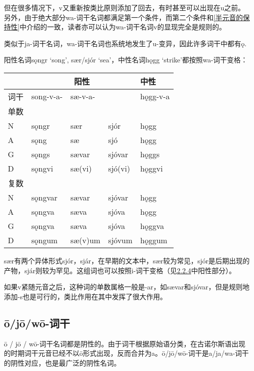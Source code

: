 但在很多情况下，v又重新按类比原则添加了回去，有时甚至可以出现在u之前。另外，由于绝大部分wa-词干名词都满足第一个条件，而第二个条件和\ref{半元音的保持性}中介绍的一致，读者亦可以认为wa-词干名词v的显现完全是规则的。

类似于ja-词干名词，wa-词干名词也系统地发生了u-变异，因此许多词干中都有ǫ.

阳性名词sǫngr `song', sær/sjór `sea'，中性名词hǫgg
`strike'都按照wa-词干变格：

\begin{longtable}{lllll}
  \toprule
     & \multicolumn{3}{c}{阳性} & 中性                           \\
  \midrule
  \endhead
  \bottomrule
  \endfoot
  词干 & song-v-a-              & sæ-v-a- &         & hǫgg-v-a \\
  单数 &                        &         &         &          \\
  N  & sǫngr                  & sær     & sjór    & hǫgg     \\
  A  & sǫng                   & sæ      & sjó     & hǫgg     \\
  G  & sǫngs                  & sævar   & sjóvar  & hǫggs    \\
  D  & sǫngvi                 & sæ(vi)  & sjó(vi) & hǫggvi   \\
  复数 &                        &         &         &          \\
  N  & sǫngvar                & sævar   & sjóvar  & hǫgg     \\
  A  & sǫngva                 & sæva    & sjóva   & hǫgg     \\
  G  & sǫngva                 & sæva    & sjóva   & hǫggva   \\
  D  & sǫngum                 & sæ(v)um & sjóvum  & hǫggum   \\
\end{longtable}

sær有两个异体形式sjór，sjár，在早期的文本中，sær较为常见，sjór是后期出现的产物，sjár则较为罕见。这组词也可以按照i-词干变格（见\hyperref[_Ref115770706]{2.2.4}中阳性部分）。

如果v紧随元音之后，这种词的单数属格一般是-ar，如sævar和sjóvar，但是规则地添加-s也是可行的，类比作用在其中发挥了很大作用。

\subsection{ō/jō/wō-词干}\label{ō/jō/wō-词干}

ō / jō /
wō-词干名词都是阴性的。由于词干根据原始语分类，在古诺尔斯语出现的时期词干元音已经不以ō形式出现，反而合并为a。ō/jō/wō-词干是a/ja/wa-词干的阴性对应，也是最广泛的阴性名词。

